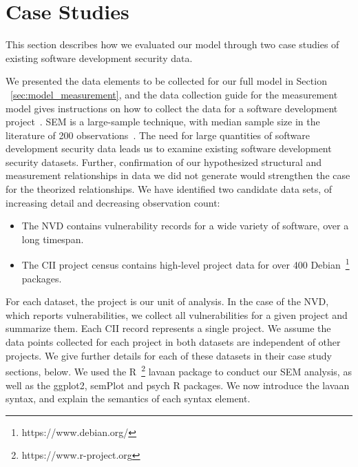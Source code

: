 \section{Case Studies}
\label{sec:evaluation}
This section describes how we evaluated our model through two case studies of existing software development security data.

We presented the data elements to be collected for our full model in Section ~\ref{sec:model_measurement}, and the data collection guide for the measurement model gives instructions on how to collect the data for a software development project~\cite{morrison2016spefsite}.  SEM is a large-sample technique, with median sample size in the literature of 200 observations~\cite{kline2015principles}. The need for large quantities of software development security data leads us to examine existing software development security datasets. Further, confirmation of our hypothesized structural and measurement relationships in data we did not generate would strengthen the case for the theorized relationships.
We have identified two candidate data sets, of increasing detail and decreasing observation count: 
\begin{itemize}
\item The NVD contains vulnerability records for a wide variety of software, over a long timespan.
\item The CII project census contains high-level project data for over 400 Debian~\footnote{https://www.debian.org/} packages.
\end{itemize}

For each dataset, the project is our unit of analysis. In the case of the NVD, which reports vulnerabilities, we collect all vulnerabilities for a given project and summarize them. Each CII record represents a single project. We assume the data points collected for each project in both datasets are independent of other projects.  We give further details for each of these datasets in their case study sections, below. We used the R~\footnote{https://www.r-project.org} lavaan package to conduct our SEM analysis, as well as the ggplot2, semPlot and psych R packages. We now introduce the lavaan syntax, and explain the semantics of each syntax element.

